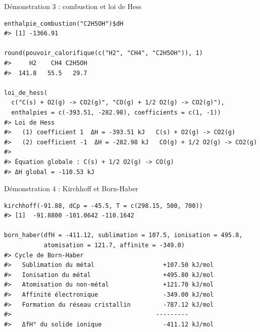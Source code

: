 \documentclass[aspectratio=169,10pt]{beamer}
\begin{document}
\begin{frame}[fragile]{Démonstration 3 : combustion et loi de Hess}
\begin{Verbatim}[fontsize=\footnotesize]
enthalpie_combustion("C2H5OH")$dH
#> [1] -1366.91

round(pouvoir_calorifique(c("H2", "CH4", "C2H5OH")), 1)
#>     H2    CH4 C2H5OH
#>  141.8   55.5   29.7

loi_de_hess(
  c("C(s) + O2(g) -> CO2(g)", "CO(g) + 1/2 O2(g) -> CO2(g)"),
  enthalpies = c(-393.51, -282.98), coefficients = c(1, -1))
#> Loi de Hess
#>   (1) coefficient 1  ΔH = -393.51 kJ   C(s) + O2(g) -> CO2(g)
#>   (2) coefficient -1  ΔH = -282.98 kJ   CO(g) + 1/2 O2(g) -> CO2(g)
#>
#> Équation globale : C(s) + 1/2 O2(g) -> CO(g)
#> ΔH global = -110.53 kJ
\end{Verbatim}
\end{frame}

\begin{frame}[fragile]{Démonstration 4 : Kirchhoff et Born-Haber}
\begin{Verbatim}[fontsize=\footnotesize]
kirchhoff(-91.88, dCp = -45.5, T = c(298.15, 500, 700))
#> [1]  -91.8800 -101.0642 -110.1642

born_haber(dfH = -411.12, sublimation = 107.5, ionisation = 495.8,
           atomisation = 121.7, affinite = -349.0)
#> Cycle de Born-Haber
#>   Sublimation du métal                   +107.50 kJ/mol
#>   Ionisation du métal                    +495.80 kJ/mol
#>   Atomisation du non-métal               +121.70 kJ/mol
#>   Affinité électronique                  -349.00 kJ/mol
#>   Formation du réseau cristallin         -787.12 kJ/mol
#>                                        ---------
#>   ΔfH° du solide ionique                 -411.12 kJ/mol
\end{Verbatim}
\end{frame}
\end{document}
